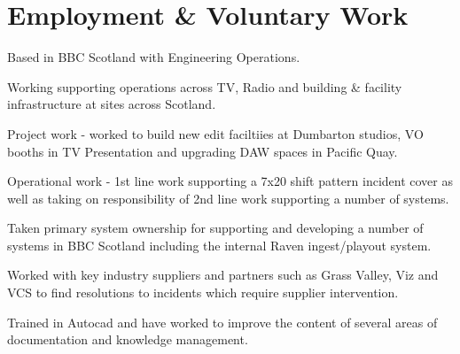 \documentclass[]{deedy-resume-openfont}
\begin{document}
\hfill
\begin{minipage}[t]{0.66\textwidth} 


\section{Employment \& Voluntary Work}

\vspace{\topsep} %
\begin{tightemize}
\item Based in BBC Scotland with Engineering Operations.
\item Working supporting operations across TV, Radio and building \& facility infrastructure at sites across Scotland.
\item Project work - worked to build new edit faciltiies at Dumbarton studios, VO booths in TV Presentation and upgrading DAW spaces in Pacific Quay.
\item Operational work - 1st line work supporting a 7x20 shift pattern incident cover as well as taking on responsibility of 2nd line work supporting a number of systems.
\item Taken primary system ownership for supporting and developing a number of systems in BBC Scotland including the internal Raven ingest/playout system.
\item Worked with key industry suppliers and partners such as Grass Valley, Viz and VCS to find resolutions to incidents which require supplier intervention. 
\item Trained in Autocad and have worked to improve the content of several areas of documentation and knowledge management.
\end{tightemize}
\sectionsep


\end{minipage}
\end{document}
